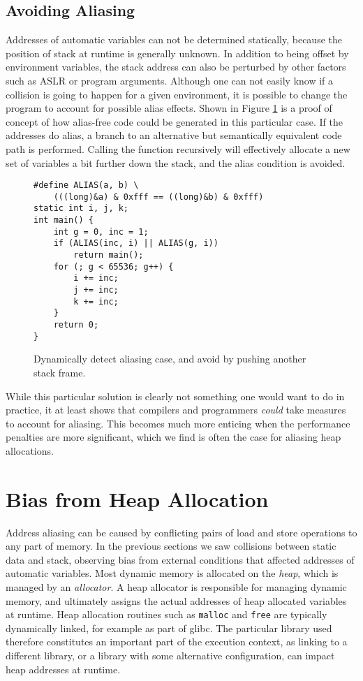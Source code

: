 \documentclass[prodmode,acmtaco]{acmsmall}
\begin{document}
{\subsection{Avoiding Aliasing}
Addresses of automatic variables can not be determined statically, because the position of stack at runtime is generally unknown. 
In addition to being offset by environment variables, the stack address can also be perturbed by other factors such as ASLR or program arguments. 
Although one can not easily know if a collision is going to happen for a given environment, it is possible to change the program to account for possible alias effects.
Shown in Figure \ref{lst:loopfixed} is a proof of concept of how alias-free code could be generated in this particular case.
If the addresses do alias, a branch to an alternative but semantically equivalent code path is performed.
Calling the function recursively will effectively allocate a new set of variables a bit further down the stack, and the alias condition is avoided.

\begin{figure}
  \begin{lstlisting}[frame=single, xleftmargin=.1\textwidth, xrightmargin=.1\textwidth]
#define ALIAS(a, b) \
    (((long)&a) & 0xfff == ((long)&b) & 0xfff)
static int i, j, k;
int main() {
    int g = 0, inc = 1;
    if (ALIAS(inc, i) || ALIAS(g, i))
        return main();
    for (; g < 65536; g++) {
        i += inc;
        j += inc;
        k += inc;
    }
    return 0;
}
  \end{lstlisting}
  \caption{Dynamically detect aliasing case, and avoid by pushing another stack frame.}
  \label{lst:loopfixed}
\end{figure}

While this particular solution is clearly not something one would want to do in practice, it at least shows that compilers and programmers \emph{could} take measures to account for aliasing.
This becomes much more enticing when the performance penalties are more significant, which we find is often the case for aliasing heap allocations.


\section{Bias from Heap Allocation}
\label{sec:heap}
Address aliasing can be caused by conflicting pairs of load and store operations to any part of memory.
In the previous sections we saw collisions between static data and stack, observing bias from external conditions that affected addresses of automatic variables.
Most dynamic memory is allocated on the \emph{heap}, which is managed by an \emph{allocator}.
A heap allocator is responsible for managing dynamic memory, and ultimately assigns the actual addresses of heap allocated variables at runtime.
Heap allocation routines such as \texttt{malloc} and \texttt{free} are typically dynamically linked, for example as part of glibc.
The particular library used therefore constitutes an important part of the execution context, as linking to a different library, or a library with some alternative configuration, can impact heap addresses at runtime.


}
\end{document}
